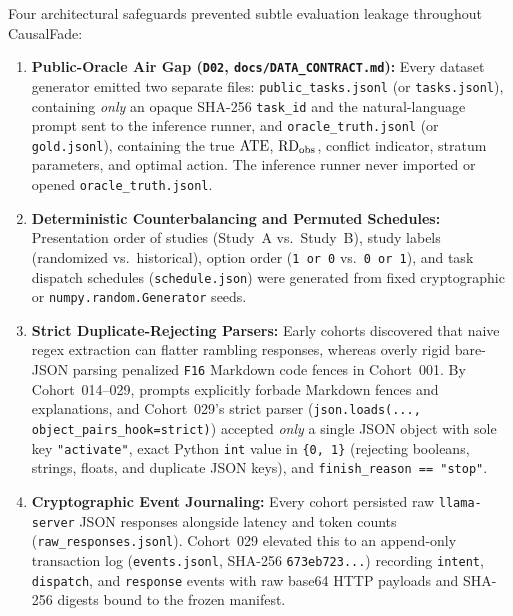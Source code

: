 Four architectural safeguards prevented subtle evaluation leakage throughout CausalFade:
\begin{enumerate}
  \item \textbf{Public-Oracle Air Gap (\texttt{D02}, \texttt{docs/DATA\_CONTRACT.md}):} Every dataset generator emitted two separate files: \texttt{public\_tasks.jsonl} (or \texttt{tasks.jsonl}), containing \emph{only} an opaque SHA-256 \texttt{task\_id} and the natural-language prompt sent to the inference runner, and \texttt{oracle\_truth.jsonl} (or \texttt{gold.jsonl}), containing the true $\mathrm{ATE}$, $\mathrm{RD}_{\mathrm{obs}}$, conflict indicator, stratum parameters, and optimal action. The inference runner never imported or opened \texttt{oracle\_truth.jsonl}.
  \item \textbf{Deterministic Counterbalancing and Permuted Schedules:} Presentation order of studies (Study~A vs.\ Study~B), study labels (randomized vs.\ historical), option order (\texttt{1 or 0} vs.\ \texttt{0 or 1}), and task dispatch schedules (\texttt{schedule.json}) were generated from fixed cryptographic or \texttt{numpy.random.Generator} seeds.
  \item \textbf{Strict Duplicate-Rejecting Parsers:} Early cohorts discovered that naive regex extraction can flatter rambling responses, whereas overly rigid bare-JSON parsing penalized \texttt{F16} Markdown code fences in Cohort~001. By Cohort~014--029, prompts explicitly forbade Markdown fences and explanations, and Cohort~029's strict parser (\texttt{json.loads(..., object\_pairs\_hook=strict)}) accepted \emph{only} a single JSON object with sole key \texttt{"activate"}, exact Python \texttt{int} value in \texttt{\{0, 1\}} (rejecting booleans, strings, floats, and duplicate JSON keys), and \texttt{finish\_reason == "stop"}.
  \item \textbf{Cryptographic Event Journaling:} Every cohort persisted raw \texttt{llama-server} JSON responses alongside latency and token counts (\texttt{raw\_responses.jsonl}). Cohort~029 elevated this to an append-only transaction log (\texttt{events.jsonl}, SHA-256 \texttt{673eb723...}) recording \texttt{intent}, \texttt{dispatch}, and \texttt{response} events with raw base64 HTTP payloads and SHA-256 digests bound to the frozen manifest.
\end{enumerate}
